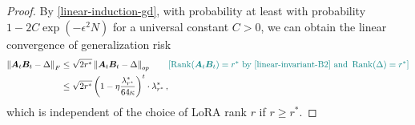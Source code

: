 \begin{proof}
By \cref{linear-induction-gd}, with probability at least with probability $1- 2C\exp(-\epsilon^2 N)$ for a universal constant $C>0$, we can obtain the linear convergence of generalization risk
\begin{align*}
    \left\|\bm A_t \bm B_t - \Delta\right\|_F & \leq \sqrt{2 r^*} \left\|\bm A_t \bm B_t - \Delta\right\|_{op}\tag*{\color{teal}$\left[\operatorname{Rank}(\bm A_t \bm B_t)=r^*\text{ by \cref{linear-invariant-B2} and }\operatorname{Rank}(\Delta)=r^*\right]$}\\
    & \leq \sqrt{2 r^*} \left(1 - \eta \frac{\lambda_{r^*}^*}{64 \kappa}\right)^{t}\cdot\lambda_{r^*}^*\,,
\end{align*}
which is independent of the choice of LoRA rank $r$ if $r\geq r^*$.
\end{proof}